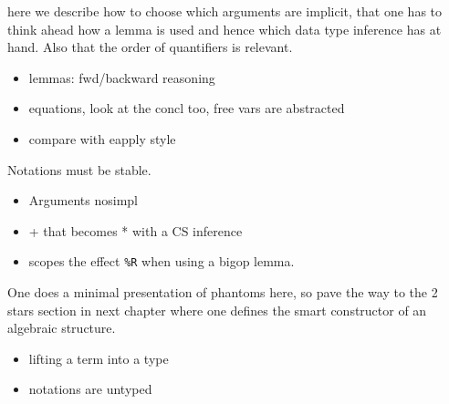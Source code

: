 \label{sec:declaringimpl}

here we describe how to choose which arguments are implicit,
that one has to think ahead how  a lemma is used and hence
which data type inference has at hand.  Also that the order
of quantifiers is relevant.
\begin{itemize}
\item lemmas: fwd/backward reasoning
\item equations, look at the concl too, free vars are abstracted
\item compare with eapply style
\end{itemize}


Notations must be stable.
\begin{itemize}
\item Arguments nosimpl
\item + that becomes * with a CS inference
\item scopes the effect \lstinline/%R/ when using a bigop lemma.
\end{itemize}


One does a minimal presentation of phantoms here, so pave the way to
the 2 stars section in next chapter where one defines the smart
constructor of an algebraic structure.
\begin{itemize}
\item lifting a term into a type
\item notations are untyped
\end{itemize}

\mcbPROVIDE{}
\label{sec:typeinfrelated}

